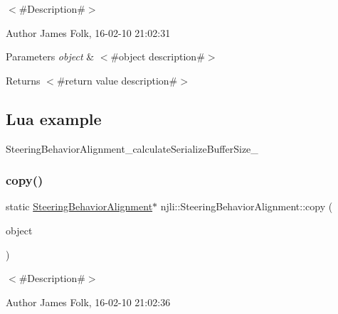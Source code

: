 $<$\#\+Description\#$>$ 

\begin{DoxyAuthor}{Author}
James Folk, 16-\/02-\/10 21\+:02\+:31
\end{DoxyAuthor}

\begin{DoxyParams}{Parameters}
{\em object} & $<$\#object description\#$>$\\
\hline
\end{DoxyParams}
\begin{DoxyReturn}{Returns}
$<$\#return value description\#$>$
\end{DoxyReturn}
\hypertarget{classnjli_1_1_steering_behavior_wander_ex1}{}\subsection{Lua example}\label{classnjli_1_1_steering_behavior_wander_ex1}

\begin{DoxyCodeInclude}
\end{DoxyCodeInclude}
Steering\+Behavior\+Alignment\+\_\+calculate\+Serialize\+Buffer\+Size\+\_\+ \mbox{\label{classnjli_1_1_steering_behavior_alignment_a3fd6800a40920454a794a1ac4e81ca5d}} 
\subsubsection{\texorpdfstring{copy()}{copy()}}
{\footnotesize\ttfamily static \mbox{\hyperlink{classnjli_1_1_steering_behavior_alignment}{Steering\+Behavior\+Alignment}}$\ast$ njli\+::\+Steering\+Behavior\+Alignment\+::copy (\begin{DoxyParamCaption}\item[{const \mbox{\hyperlink{classnjli_1_1_steering_behavior_alignment}{Steering\+Behavior\+Alignment}} \&}]{object }\end{DoxyParamCaption})\hspace{0.3cm}{\ttfamily [static]}}



$<$\#\+Description\#$>$ 

\begin{DoxyAuthor}{Author}
James Folk, 16-\/02-\/10 21\+:02\+:36
\end{DoxyAuthor}

